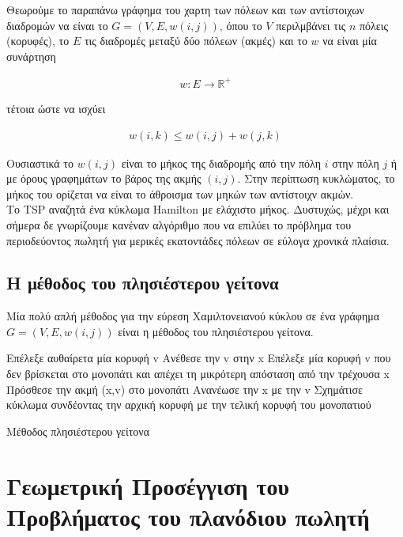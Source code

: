 \documentclass[oneside,12pt]{book}
\newcommand{\R}{\mathbb{R}}
\theoremstyle{definition}
\begin{document}
Θεωρούμε το παραπάνω γράφημα του χαρτη των πόλεων και των αντίστοιχων διαδρομών να είναι το \(G = (V,E,w(i,j))\), όπου το \(V\) περιλμβάνει τις \(n\) πόλεις  (κορυφές), το \(E\) τις διαδρομές μεταξύ δύο πόλεων (ακμές) και το \(w\) να είναι μία συνάρτηση

\begin{align}
	w:E \rightarrow \R^{+}
\end{align}

τέτοια ώστε να ισχύει

\begin{align}
	w(i,k) \leq w(i,j) + w(j,k)
\end{align}

Ουσιαστικά το \(w(i,j)\) είναι το μήκος της διαδρομής από την πόλη \(i\) στην πόλη \(j\) ή με όρους γραφημάτων το βάρος της ακμής \((i,j)\). Στην περίπτωση κυκλώματος, το μήκος του ορίζεται να είναι το άθροισμα των μηκών των αντίστοιχν ακμών. \\

Το TSP αναζητά ένα κύκλωμα Hamilton με ελάχιστο μήκος. Δυστυχώς, μέχρι και σήμερα δε γνωρίζουμε κανέναν αλγόριθμο που να επιλύει το πρόβλημα του περιοδεύοντος πωλητή για μερικές εκατοντάδες πόλεων σε εύλογα χρονικά πλαίσια. \\

\section{Η μέθοδος του πλησιέστερου γείτονα}

Μία πολύ απλή μέθοδος για την εύρεση Χαμιλτονειανού κύκλου σε ένα γράφημα \(G = (V,E,w(i,j))\) είναι η μέθοδος του πλησιέστερου γείτονα.

\begin{algorithm}[H]
	\SetAlgoLined

	Επέλεξε αυθαίρετα μία κορυφή v \;
	Ανέθεσε την v στην x \;
	{Επέλεξε μία κορυφή v που δεν βρίσκεται στο μονοπάτι και απέχει τη μικρότερη απόσταση από την τρέχουσα x \;
	Πρόσθεσε την ακμή (x,v) στο μονοπάτι \;
	Ανανέωσε την x με την v \;}
	Σχημάτισε κύκλωμα συνδέοντας την αρχική κορυφή με την τελική κορυφή του μονοπατιού \;

	\caption{Μέθοδος πλησιέστερου γείτονα}
\end{algorithm}

\chapter{Γεωμετρική Προσέγγιση του Προβλήματος του πλανόδιου πωλητή}
\end{document}
